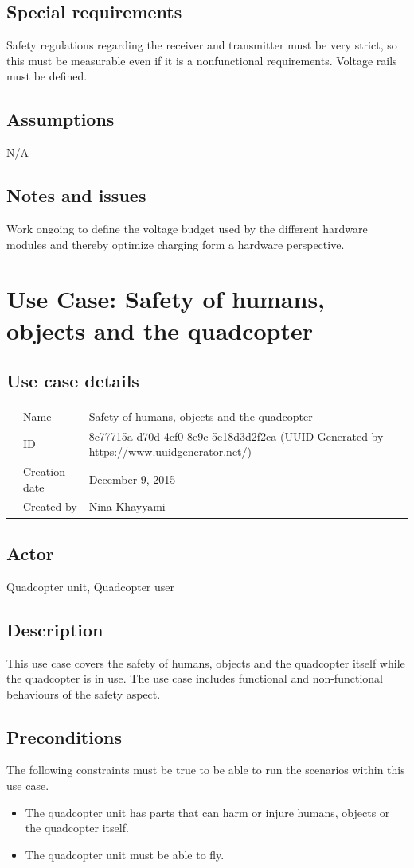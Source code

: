 \documentclass[a4paper]{article}
\begin{document}
\subsection{Special requirements}
Safety regulations regarding the receiver and transmitter must be very strict, so this must be measurable even if it is  a nonfunctional requirements. Voltage rails must be defined.
\subsection{Assumptions}
N/A
\subsection{Notes and issues}
Work ongoing to define the voltage budget used by the different hardware modules and thereby optimize charging form a hardware perspective.

\section{Use Case: Safety of humans, objects and the quadcopter}
\subsection{Use case details}

\begin{tabular}{lll}
	&Name  & Safety of humans, objects and the quadcopter\\
	&ID  & 8c77715a-d70d-4cf0-8e9c-5e18d3d2f2ca (UUID Generated by https://www.uuidgenerator.net/)  \\
	&Creation date  & December 9, 2015\\
	&Created by  & Nina Khayyami
\end{tabular}

\subsection{Actor}
Quadcopter unit, Quadcopter user
\subsection{Description}
This use case covers the safety of humans, objects and the quadcopter itself while the quadcopter is in use. The use case includes functional and non-functional behaviours of the safety aspect. 
\subsection{Preconditions}
The following constraints must be true to be able to run the scenarios within this use case.
\begin{itemize}
\item The quadcopter unit has parts that can harm or injure humans, objects or the quadcopter itself.
\item The quadcopter unit must be able to fly.
\end{itemize}
\end{document}
